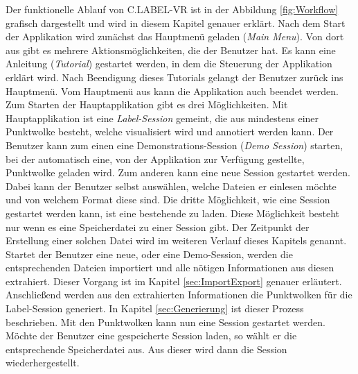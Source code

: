 Der funktionelle Ablauf von C.LABEL-VR ist in der Abbildung \ref{fig:Workflow} grafisch dargestellt und wird in diesem Kapitel genauer erklärt. Nach dem Start der Applikation wird zunächst das Hauptmenü geladen (\textit{Main Menu}). Von dort aus gibt es mehrere Aktionsmöglichkeiten, die der Benutzer hat. Es kann eine Anleitung (\textit{Tutorial}) gestartet werden, in dem die Steuerung der Applikation erklärt wird. Nach Beendigung dieses Tutorials gelangt der Benutzer zurück ins Hauptmenü. Vom Hauptmenü aus kann die Applikation auch beendet werden. Zum Starten der Hauptapplikation gibt es drei Möglichkeiten. Mit Hauptapplikation ist eine \textit{Label-Session} gemeint, die aus mindestens einer Punktwolke besteht, welche visualisiert wird und annotiert werden kann. Der Benutzer kann zum einen eine Demonstrations-Session (\textit{Demo Session}) starten, bei der automatisch eine, von der Applikation zur Verfügung gestellte, Punktwolke geladen wird. Zum anderen kann eine neue Session gestartet werden. Dabei kann der Benutzer selbst auswählen, welche Dateien er einlesen möchte und von welchem Format diese sind. Die dritte Möglichkeit, wie eine Session gestartet werden kann, ist eine bestehende zu laden. Diese Möglichkeit besteht nur wenn es eine Speicherdatei zu einer Session gibt. Der Zeitpunkt der Erstellung einer solchen Datei wird im weiteren Verlauf dieses Kapitels genannt. \\

Startet der Benutzer eine neue, oder eine Demo-Session, werden die entsprechenden Dateien importiert und alle nötigen Informationen aus diesen extrahiert. Dieser Vorgang ist im Kapitel \ref{sec:ImportExport} genauer erläutert. Anschließend werden aus den extrahierten Informationen die Punktwolken für die Label-Session generiert. In Kapitel \ref{sec:Generierung} ist dieser Prozess beschrieben. Mit den Punktwolken kann nun eine Session gestartet werden. Möchte der Benutzer eine gespeicherte Session laden, so wählt er die entsprechende Speicherdatei aus. Aus dieser wird dann die Session wiederhergestellt.\\

